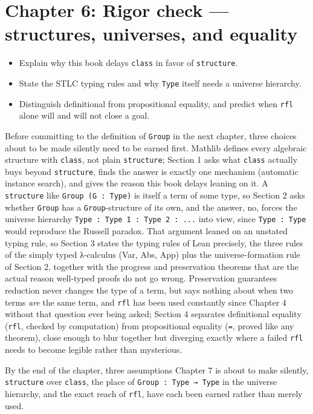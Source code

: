 \chapter{Chapter 6: Rigor check --- structures, universes, and equality}\label{sec:06-rigor-check:00-index:1}

\begin{learningobjectives}
\begin{itemize}
\tightlist
\item
  Explain why this book delays \texttt{class} in favor of \texttt{structure}.
\item
  State the STLC typing rules and why \texttt{Type} itself needs a universe hierarchy.
\item
  Distinguish definitional from propositional equality, and predict when \texttt{rfl} alone will and will not close a goal.
\end{itemize}
\end{learningobjectives}


Before committing to the definition of \texttt{Group} in the next chapter, three choices about to be made silently need to be earned first. Mathlib defines every algebraic structure with \texttt{class}, not plain \texttt{structure}; Section 1 asks what \texttt{class} actually buys beyond \texttt{structure}, finds the answer is exactly one mechanism (automatic instance search), and gives the reason this book delays leaning on it. A \texttt{structure} like \texttt{Group (G : Type)} is itself a term of some type, so Section 2 asks whether \texttt{Group} has a \texttt{Group}-structure of its own, and the answer, no, forces the universe hierarchy \texttt{Type : Type 1 : Type 2 : ...} into view, since \texttt{Type : Type} would reproduce the Russell paradox. That argument leaned on an unstated typing rule, so Section 3 states the typing rules of Lean precisely, the three rules of the simply typed λ-calculus (Var, Abs, App) plus the universe-formation rule of Section 2, together with the progress and preservation theorems that are the actual reason well-typed proofs do not go wrong. Preservation guarantees reduction never changes the type of a term, but says nothing about when two terms \emph{are} the same term, and \texttt{rfl} has been used constantly since Chapter 4 without that question ever being asked; Section 4 separates definitional equality (\texttt{rfl}, checked by computation) from propositional equality (\texttt{=}, proved like any theorem), close enough to blur together but diverging exactly where a failed \texttt{rfl} needs to become legible rather than mysterious.

By the end of the chapter, three assumptions Chapter 7 is about to make silently, \texttt{structure} over \texttt{class}, the place of \texttt{Group : Type → Type} in the universe hierarchy, and the exact reach of \texttt{rfl}, have each been earned rather than merely used.








